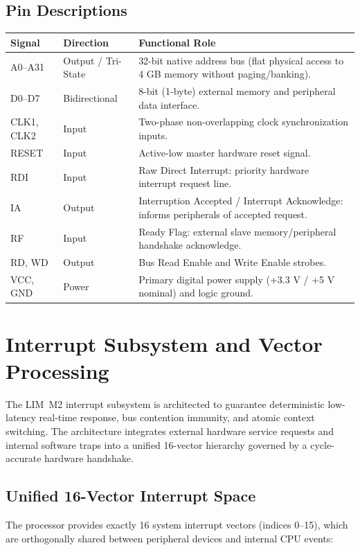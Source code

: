 \documentclass[11pt,a4paper]{article}
\begin{document}
\subsection{Pin Descriptions}
\begin{tabularx}{\textwidth}{>{\ttfamily}p{28mm}p{24mm}X}
\toprule
Signal & Direction & Functional Role \\
\midrule
A0--A31    & Output / Tri-State & 32-bit native address bus (flat physical access to 4 GB memory without paging/banking). \\
D0--D7     & Bidirectional      & 8-bit (1-byte) external memory and peripheral data interface. \\
CLK1, CLK2 & Input              & Two-phase non-overlapping clock synchronization inputs. \\
RESET      & Input              & Active-low master hardware reset signal. \\
RDI        & Input              & Raw Direct Interrupt: priority hardware interrupt request line. \\
IA         & Output             & Interruption Accepted / Interrupt Acknowledge: informs peripherals of accepted request. \\
RF         & Input              & Ready Flag: external slave memory/peripheral handshake acknowledge. \\
RD, WD     & Output             & Bus Read Enable and Write Enable strobes. \\
VCC, GND   & Power              & Primary digital power supply (+3.3 V / +5 V nominal) and logic ground. \\
\bottomrule
\end{tabularx}

\clearpage
\section{Interrupt Subsystem and Vector Processing}

The LIM~M2 interrupt subsystem is architected to guarantee deterministic low-latency real-time response, bus contention immunity, and atomic context switching. The architecture integrates external hardware service requests and internal software traps into a unified 16-vector hierarchy governed by a cycle-accurate hardware handshake.

\subsection{Unified 16-Vector Interrupt Space}
The processor provides exactly 16 system interrupt vectors (indices 0--15), which are orthogonally shared between peripheral devices and internal CPU events:
\end{document}
